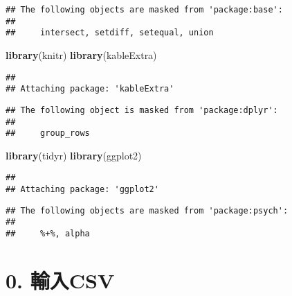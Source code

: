\documentclass[
  12pt,
]{article}
\newenvironment{Shaded}{\begin{snugshade}}{\end{snugshade}}
\newcommand{\FunctionTok}[1]{\textcolor[rgb]{0.13,0.29,0.53}{\textbf{#1}}}
\newcommand{\NormalTok}[1]{#1}
\begin{document}
\begin{verbatim}
## The following objects are masked from 'package:base':
## 
##     intersect, setdiff, setequal, union
\end{verbatim}

\begin{Shaded}
\begin{Highlighting}[]
\FunctionTok{library}\NormalTok{(knitr)}
\FunctionTok{library}\NormalTok{(kableExtra)}
\end{Highlighting}
\end{Shaded}

\begin{verbatim}
## 
## Attaching package: 'kableExtra'
\end{verbatim}

\begin{verbatim}
## The following object is masked from 'package:dplyr':
## 
##     group_rows
\end{verbatim}

\begin{Shaded}
\begin{Highlighting}[]
\FunctionTok{library}\NormalTok{(tidyr)}
\FunctionTok{library}\NormalTok{(ggplot2)}
\end{Highlighting}
\end{Shaded}

\begin{verbatim}
## 
## Attaching package: 'ggplot2'
\end{verbatim}

\begin{verbatim}
## The following objects are masked from 'package:psych':
## 
##     %+%, alpha
\end{verbatim}

\section{0. 輸入CSV}\label{ux8f38ux5165csv}
\end{document}
